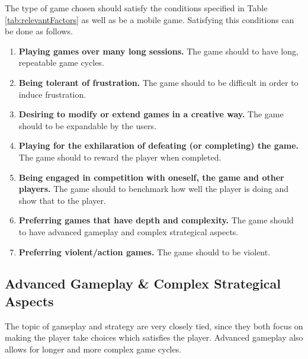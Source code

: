 The type of game chosen should satisfy the conditions specified in Table \ref{tab:relevantFactors} as well as be a mobile game.
Satisfying this conditions can be done as follows.
\begin{enumerate}\label{gamedesign:selectionofgametype:importantstuff}
\item \textbf{Playing games over many long sessions.} The game should to have long, repeatable game cycles.
\item \textbf{Being tolerant of frustration.} The game should to be difficult in order to induce frustration.
\item \textbf{Desiring to modify or extend games in a creative way.} The game should to be expandable by the users.
\item \textbf{Playing for the exhilaration of defeating (or completing) the game.} The game should to reward the player when completed.
\item \textbf{Being engaged in competition with oneself, the game and other players.} The game should to benchmark how well the player is doing and show that to the player.
\item \textbf{Preferring games that have depth and complexity.} The game should to have advanced gameplay and complex strategical aspects.
\item \textbf{Preferring violent/action games.} The game should to be violent.
\end{enumerate}

\subsection{Advanced Gameplay \& Complex Strategical Aspects}
The topic of gameplay and strategy are very closely tied, since they both focus on making the player take choices which satisfies the player.
Advanced gameplay also allows for longer and more complex game cycles.

